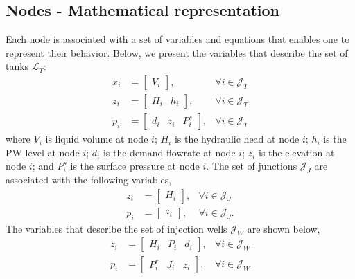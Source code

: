 \subsection{Nodes - Mathematical representation}
    \par Each node is associated with a set of variables and equations that enables one to represent their behavior. Below, we present the variables that describe the set of tanks $\mathcal{L}_T$:
    \begin{subequations}
        \begin{alignat}{2}
            x_i &= \left[\begin{array}{c}
                V_i
            \end{array}\right], &\forall i \in \mathcal{J}_T\\
            z_i &= \left[\begin{array}{cc}
                H_i & h_i
            \end{array}\right], &\forall i \in \mathcal{J}_T\\
            p_i &= \left[\begin{array}{cccc}
                d_i & z_i & P_i^s
            \end{array}\right], &\forall i \in \mathcal{J}_T
        \end{alignat}    
    \end{subequations}
    where $V_i$ is liquid volume at node $i$; $H_i$ is the hydraulic head at node $i$; $h_i$ is the PW level at node $i$; $d_i$ is the demand flowrate at node $i$; $z_i$ is the elevation at node $i$; and $P_i^s$ is the surface pressure at node $i$. The set of junctions $\mathcal{J}_J$ are associated with the following variables,
    \begin{subequations}
    \begin{alignat}{2}
        z_i &= \left[\begin{array}{c}
            H_i
        \end{array}\right], &\forall i \in \mathcal{J}_J \\
        p_i &= \left[\begin{array}{ccc}
            z_i
        \end{array}\right], &\forall i \in \mathcal{J}_J.
    \end{alignat}
    \end{subequations}
    The variables that describe the set of injection wells $\mathcal{J}_W$ are shown below,
    \begin{subequations}
    \begin{alignat}{2}
        z_i &= \left[\begin{array}{ccc}
            H_i & P_i & d_i
        \end{array}\right], & \forall i \in \mathcal{J}_W \\
        p_i &= \left[\begin{array}{ccc}
            P_i^r & J_i & z_i
        \end{array}\right], & \forall i \in \mathcal{J}_W
    \end{alignat}
    \end{subequations}
